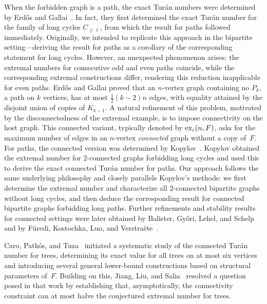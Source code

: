 \documentclass[11pt,a4paper]{article}
\newcommand{\ex}{{\rm ex}}
\begin{document}
When the forbidden graph is a path, the exact Turán numbers were determined by Erd\H{o}s and Gallai~\cite{erdHos1959maximal}.  
In fact, they first determined the exact Turán number for the family of long cycles $ C_{\ge \ell}$, from which the result for paths followed immediately.
Originally, we intended to replicate this approach in the bipartite setting—deriving the result for paths as a corollary of the corresponding statement for long cycles.
However, an unexpected phenomenon arises: the extremal numbers for consecutive odd and even paths coincide, while the corresponding extremal constructions differ, rendering this reduction inapplicable for even paths.
Erd\H{o}s and Gallai proved that an $n$-vertex graph containing no $P_k$, a path on $k$ vertices, has at most $\tfrac{1}{2}(k-2)n$ edges, with equality attained by the disjoint union of copies of $K_{k-1}$.  
A natural refinement of this problem, motivated by the disconnectedness of the extremal example, is to impose connectivity on the host graph.  
This connected variant, typically denoted by $\ex_c(n, F)$, asks for the maximum number of edges in an $n$-vertex \emph{connected} graph without a copy of~$F$.  
For paths, the connected version was determined by Kopylov~\cite{kopylov1977maximal}.
Kopylov obtained the extremal number for $2$-connected graphs forbidding long cycles and used this to derive the exact connected Turán number for paths.  
Our approach follows the same underlying philosophy and closely parallels Kopylov’s methods: we first determine the extremal number and characterize all $2$-connected bipartite graphs without long cycles, and then deduce the corresponding result for connected bipartite graphs forbidding long paths.
Further refinements and stability results for connected settings were later obtained by Balister, Győri, Lehel, and Schelp~\cite{balister2008connected} and by Füredi, Kostochka, Luo, and Verstraëte~\cite{furedi2018stability,furedi2016stability}.



Caro, Patkós, and Tuza~\cite{caro2024connected} initiated a systematic study of the connected Turán number for trees, determining its exact value for all trees on at most six vertices and introducing several general lower-bound constructions based on structural parameters of~$F$.
Building on this, Jiang, Liu, and Salia~\cite{jiang2024connectivity} resolved a question posed in that work by establishing that, asymptotically, the connectivity constraint can at most halve the conjectured extremal number for trees.
\end{document}
